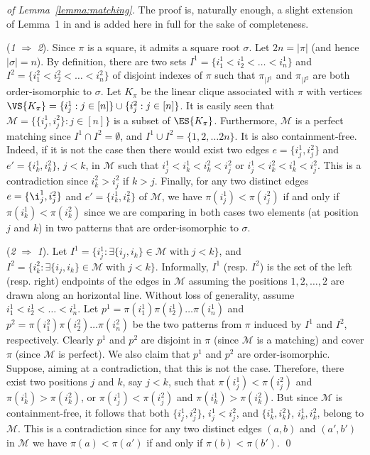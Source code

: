 \begin{proof}[of Lemma~\ref{lemma:matching}]
    The proof is, naturally enough, a slight extension of
    Lemma~1 in \cite{Rizzi:Vialette:CSR:2013} and is added here in full
    for the sake of completeness.

    (\emph{1} $\Rightarrow$ \emph{2}).
    Since $\pi$ is a square, it admits a square root $\sigma$.
    Let $2n = |\pi|$ (and hence
    $|\sigma| = n$).
    By definition, there are two sets $I^1 = \{i^1_1 < i^1_2 < \dots < i^1_n\}$
    and $I^2 = \{i^2_1 < i^2_2 < \dots < i^2_n\}$ of disjoint indexes of
    $\pi$ such that $\pi_{|I^1}$ and $\pi_{|I^2}$ are both
    order-isomorphic to $\sigma$.
    Let $K_\pi$ be the linear clique associated with $\pi$ with vertices
    $\VS{K_\pi} = \{i^1_j : j \in [n]\} \cup \{i^2_j : j \in [n]\}$. It
    is easily seen that $\mathcal{M} = \{\{i^1_j, i^2_j\} : j \in [n]\}$
    is a subset of $\ES{K_\pi}$. Furthermore, $\mathcal{M}$ is a perfect
    matching since $I^1 \cap I^2 = \emptyset$, and
    $I^1 \cup I^2 = \{1, 2,  \dots 2n\}$. It is also containment-free.
    Indeed, if it is not the case then there would exist two edges
    $e = \{i^1_j, i^2_j\}$ and $e' = \{i^1_k, i^2_k\}$, $j < k$, in
    $\mathcal{M}$ such that $i^1_j < i^1_k < i^2_k < i^2_j$ or
    $i^1_j < i^2_k < i^1_k < i^2_j$. This is a contradiction since
    $i^2_k > i^2_j$ if $k > j$. Finally, for any two distinct edges
    $e = \{\i^1_j, i^2_j\}$ and $e' = \{i^1_k, i^2_k\}$ of $\mathcal{M}$,
    we have $\pi(i^1_j) < \pi(i^2_j)$ if and only if
    $\pi(i^1_k) < \pi(i^2_k)$ since we are comparing in both cases two
    elements (at position $j$ and $k$) in two patterns that are
    order-isomorphic to $\sigma$.

    (\emph{2} $\Rightarrow$ \emph{1}).
    Let $I^1 = \{i^1_j : \exists \{i_j, i_k\} \in \mathcal{M}
    \;\text{with}\; j < k\}$, and
    $I^2 = \{i^2_k : \exists \{i_j, i_k\} \in \mathcal{M}
    \;\text{with}\; j < k\}$.
    Informally, $I^1$ (resp. $I^2$) is the set of the left (resp. right)
    endpoints of the edges in $\mathcal{M}$ assuming the positions
    $1, 2, \dots, 2$ are drawn along an horizontal line.
    Without loss of generality, assume $i^1_1 < i^1_2 < \dots < i^1_n$.
    Let $p^1 = \pi(i^1_1) \pi(i^1_2) \dots \pi(i^1_n)$ and
    $p^2 = \pi(i^2_1) \pi(i^2_2) \dots \pi(i^2_n)$ be the two patterns
    from $\pi$ induced by $I^1$ and $I^2$, respectively. Clearly $p^1$
    and $p^2$ are disjoint in $\pi$ (since $\mathcal{M}$ is a matching)
    and cover $\pi$ (since $\mathcal{M}$ is perfect). We also claim that
    $p^1$ and $p^2$ are order-isomorphic. Suppose, aiming at a
    contradiction, that this is not the case. Therefore, there exist two
    positions $j$ and $k$, say $j < k$, such that
    $\pi(i^1_j) < \pi(i^2_j)$ and $\pi(i^1_k) > \pi(i^2_k)$, or
    $\pi(i^1_j) < \pi(i^2_j)$ and $\pi(i^1_k) > \pi(i^2_k)$.
    But since $\mathcal{M}$ is containment-free, it follows that both
    $\{i^1_j, i^2_j\}$, $i^1_j < i^2_j$, and $\{i^1_k, i^2_k\}$,
    $i^1_k, i^2_k$, belong to $\mathcal{M}$. This is a contradiction
    since for any two distinct edges $(a, b)$ and $(a', b')$ in
    $\mathcal{M}$ we have $\pi(a) < \pi(a')$ if and only if
    $\pi(b) < \pi(b')$.
    \qed
\end{proof}
